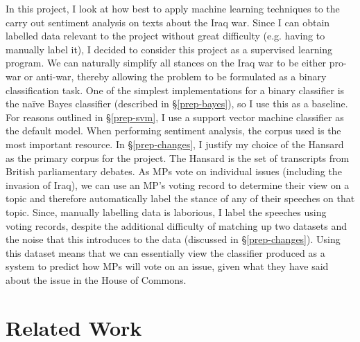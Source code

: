 \documentclass[12pt,a4paper,twoside,openright]{report}
\begin{document}
In this project, I look at how best to apply machine learning techniques to the carry out sentiment analysis on texts about the Iraq war. Since I can obtain labelled data relevant to the project without great difficulty (e.g. having to manually label it), I decided to consider this project as a supervised learning program. We can naturally simplify all stances on the Iraq war to be either pro-war or anti-war, thereby allowing the problem to be formulated as a binary classification task. One of the simplest implementations for a binary classifier is the na\"{i}ve Bayes classifier (described in \S\ref{prep-bayes}), so I use this as a baseline. For reasons outlined in \S\ref{prep-svm}, I use a support vector machine classifier as the default model.
\newline
\newline
When performing sentiment analysis, the corpus used is the most important resource. In \S\ref{prep-changes}, I justify my choice of the Hansard \cite{hansard} as the primary corpus for the project. The Hansard is the set of transcripts from British parliamentary debates. As MPs vote on individual issues (including the invasion of Iraq), we can use an MP's voting record to determine their view on a topic and therefore automatically label the stance of any of their speeches on that topic. Since, manually labelling data is laborious, I label the speeches using voting records, despite the additional difficulty of matching up two datasets and the noise that this introduces to the data (discussed in \S\ref{prep-changes}). Using this dataset means that we can essentially view the classifier produced as a system to predict how MPs will vote on an issue, given what they have said about the issue in the House of Commons.


\section{Related Work} \label{intro-related}
\end{document}
